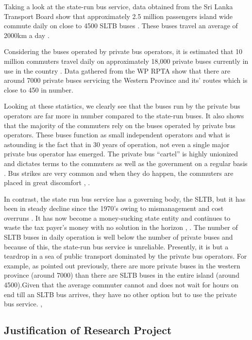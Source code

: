 \documentclass[12pt, oneside]{report}
\begin{document}
Taking a look at the state-run bus service, data obtained from the Sri Lanka Transport Board show that approximately 2.5 million passengers island wide commute daily on close to 4500 SLTB buses \citep{SriLankaTransportBoard2010}. These buses travel an average of 2000km a day \citep{SriLankaTransportBoard2012}. 

Considering the buses operated by private bus operators, it is estimated that 10 million commuters travel daily on approximately 18,000 private buses currently in use in the country \citep{Silva2010}. Data gathered from the WP RPTA show that there are around 7000 private buses servicing the Western Province and its’ routes which is close to 450 in number. 

Looking at these statistics, we clearly see that the buses run by the private bus operators are far more in number compared to the state-run buses. It also shows that the majority of the commuters rely on the buses operated by private bus operators. These buses function as small independent operators and what is astounding is the fact that in 30 years of operation, not even a single major private bus operator has emerged. The private bus “cartel” is highly unionized and dictates terms to the commuters as well as the government on a regular basis \citep{AdaDerana2012}. Bus strikes are very common and when they do happen, the commuters are placed in great discomfort \citep{Samarajiva2012}, \citep{ColomboPage2012}.

In contrast, the state run bus service has a governing body, the SLTB, but it has been in steady decline since the 1970’s owing to mismanagement and cost overruns \citep{AnswersDotCom2012}. It has now become a money-sucking state entity and continues to waste the tax payer's money with no solution in the horizon \citep{LBO2011}, \citep{Sirimanne2013}. The number of SLTB buses in daily operation is well below the number of private buses and because of this, the state-run bus service is unreliable. Presently, it is but a teardrop in a sea of public transport dominated by the private bus operators. For example, as pointed out previously, there are more private buses in the western province (around 7000) than there are SLTB buses in the entire island (around 4500).Given that the average commuter cannot and does not wait for hours on end till an SLTB bus arrives, they have no other option but to use the private bus service. \citep{Wijayapala2012}, \citep{Azwer2012}

\subsection{Justification of Research Project}
\end{document}
